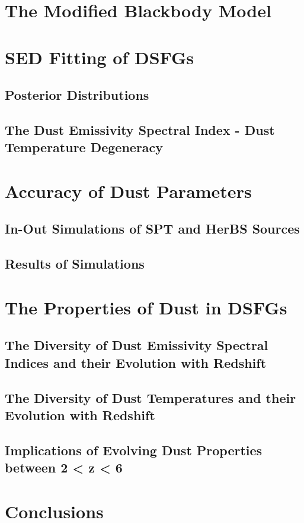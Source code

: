 \section{The Modified Blackbody Model}
\section{SED Fitting of DSFGs}
\subsection{Posterior Distributions}
\subsection{The Dust Emissivity Spectral Index - Dust Temperature Degeneracy}
\section{Accuracy of Dust Parameters}
\subsection{In-Out Simulations of SPT and HerBS Sources}
\subsection{Results of Simulations}
\section{The Properties of Dust in DSFGs}
\subsection{The Diversity of Dust Emissivity Spectral Indices and their Evolution with Redshift}
\subsection{The Diversity of Dust Temperatures and their Evolution with Redshift}
\subsection{Implications of Evolving Dust Properties between 2 < z < 6}
\section{Conclusions}

\listoftodos